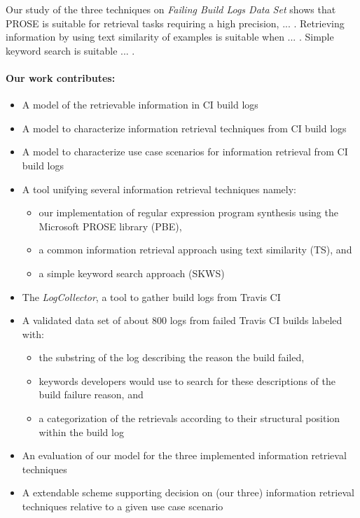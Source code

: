 \documentclass[\myrootdir/main.tex]{subfiles}
\begin{document}
Our study of the three techniques on \emph{Failing Build Logs Data Set} shows that PROSE is suitable for retrieval tasks requiring a high precision, ... . Retrieving information by using text similarity of examples is suitable when ... . Simple keyword search is suitable ... .


\paragraph{Our work contributes:}
\begin{itemize}
  \item A model of the retrievable information in CI build logs
  \item A model to characterize information retrieval techniques from CI build logs
  \item A model to characterize use case scenarios for information retrieval from CI build logs
  \item A tool unifying several information retrieval techniques namely:
        \begin{itemize}
          \item our implementation of regular expression program synthesis using the Microsoft PROSE library (PBE),
          \item a common information retrieval approach using text similarity (TS), and
          \item a simple keyword search approach (SKWS)
        \end{itemize}
  \item The \emph{LogCollector}, a tool to gather build logs from Travis CI
  \item A validated data set of about 800 logs from failed Travis CI builds labeled with:
        \begin{itemize}
          \item the substring of the log describing the reason the build failed,
          \item keywords developers would use to search for these descriptions of the build failure reason, and
          \item a categorization of the retrievals according to their structural position within the build log
        \end{itemize}
  \item An evaluation of our model for the three implemented information retrieval techniques 
  \item A extendable scheme supporting decision on (our three) information retrieval techniques relative to a given use case scenario
\end{itemize}
\end{document}

